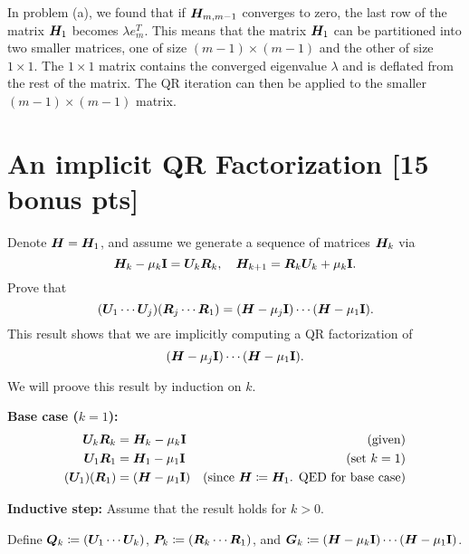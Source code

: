 \documentclass[twoside,10pt]{article}
\begin{document}
In problem (a), we found that if $\bm{H}_{m, m-1}$ converges to zero, the last row of the matrix $\bm{H}_1$ becomes $\lambda e_m^T$.
This means that the matrix $\bm{H}_1$ can be partitioned into two smaller matrices, one of size $(m-1) \times (m-1)$ and the other of size $1 \times 1$.
The $1 \times 1$ matrix contains the converged eigenvalue $\lambda$ and is deflated from the rest of the matrix.
The QR iteration can then be applied to the smaller $(m-1) \times (m-1)$ matrix.

\section{An implicit QR Factorization [15 bonus pts]}
Denote $\bm{H} = \bm{H}_1$, and assume we generate a sequence of matrices $\bm{H}_k$ via 
\begin{equation}
  \bm{H}_k - \mu_k \mathbf{I} = \bm{U}_k \bm{R}_k, \quad \bm{H}_{k + 1} = \bm{R}_k \bm{U}_k + \mu_k \mathbf{I}. 
\end{equation}
Prove that 
\begin{equation}
  \left(\mtx{U}_1 \cdots \mtx{U}_j\right)\left(\mtx{R}_j \cdots \mtx{R}_1\right) = \left(\mtx{H} - \mu_{j} \Id\right) \cdots \left(\mtx{H} - \mu_1 \Id\right). 
\end{equation}
This result shows that we are implicitly computing a QR factorization of 
\begin{equation}
  \left(\mtx{H} - \mu_j \Id\right) \cdots \left(\mtx{H} - \mu_1 \Id\right).   
\end{equation}

\quad We will proove this result by induction on $k$.

\textbf{Base case ($k = 1$):}
\begin{align*}
  \mtx{U}_k \mtx{R}_k &= \mtx{H}_k - \mu_k \Id&\text{(given)}\\
  \mtx{U}_1 \mtx{R}_1 &= \mtx{H}_1 - \mu_1 \Id&\text{(set $k = 1$)}\\
  \left(\mtx{U}_1\right)\left(\mtx{R}_1\right) &= \left(\mtx{H} - \mu_1 \Id\right)&\text{(since $\mtx{H} \coloneqq \mtx{H}_1$. QED for base case)}
\end{align*}

\textbf{Inductive step:}
Assume that the result holds for $k > 0$.

Define $\mtx{Q}_k \coloneqq \left(\mtx{U}_1 \cdots \mtx{U}_k\right)$, $\mtx{P}_k \coloneqq \left(\mtx{R}_k \cdots \mtx{R}_1\right)$, and $\mtx{G}_k \coloneqq \left(\mtx{H} - \mu_k \Id\right) \cdots \left(\mtx{H} - \mu_1 \Id\right)$.
\end{document}
